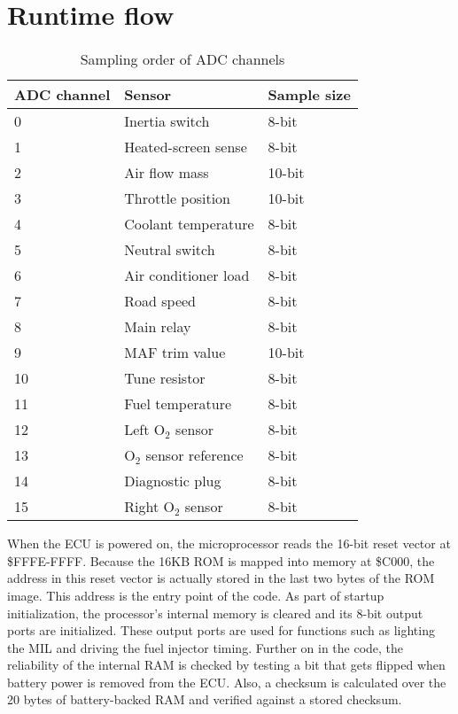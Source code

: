 \documentclass[11pt,twocolumn]{scrartcl}
\begin{document}
\section {Runtime flow}
\begin{table*}
 \centering
 \begin{tabular}{|l|l|l|}
  \hline
  \bfseries{ADC channel} & \bfseries{Sensor} & \bfseries{Sample size} \\ \hline
  0  & Inertia switch & 8-bit \\ \hline
  1  & Heated-screen sense & 8-bit \\ \hline
  2  & Air flow mass & 10-bit \\ \hline
  3  & Throttle position & 10-bit \\ \hline
  4  & Coolant temperature & 8-bit \\ \hline
  5  & Neutral switch & 8-bit \\ \hline
  6  & Air conditioner load & 8-bit \\ \hline
  7  & Road speed & 8-bit \\ \hline
  8  & Main relay & 8-bit \\ \hline
  9  & MAF trim value & 10-bit \\ \hline
  10 & Tune resistor & 8-bit \\ \hline
  11 & Fuel temperature & 8-bit \\ \hline
  12 & Left O$_{2}$ sensor & 8-bit \\ \hline
  13 & O$_{2}$ sensor reference & 8-bit \\ \hline
  14 & Diagnostic plug & 8-bit \\ \hline
  15 & Right O$_{2}$ sensor & 8-bit \\ \hline
  \end{tabular}
 \caption{Sampling order of ADC channels \label{tab:ADCsampling}}
\end{table*}
When the ECU is powered on, the microprocessor reads the 16-bit reset vector at \$FFFE-FFFF. Because the 16KB ROM is mapped into memory at \$C000, the address in this reset vector is actually stored in the last two bytes of the ROM image. This address is the entry point of the code. As part of startup initialization, the processor's internal memory is cleared and its 8-bit output ports are initialized. These output ports are used for functions such as lighting the MIL and driving the fuel injector timing. Further on in the code, the reliability of the internal RAM is checked by testing a bit that gets flipped when battery power is removed from the ECU. Also, a checksum is calculated over the 20 bytes of battery-backed RAM and verified against a stored checksum.
\end{document}
